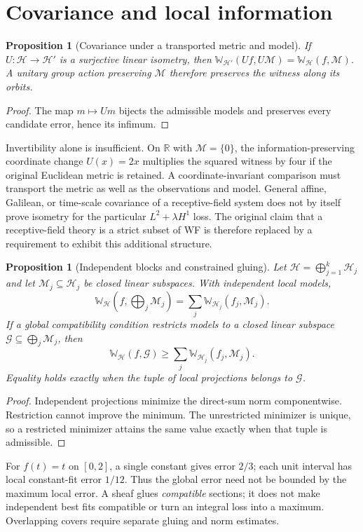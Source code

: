 \documentclass[11pt,letterpaper]{article}
\newtheorem{proposition}[theorem]{Proposition}
\newcommand{\HH}{\mathcal H}
\newcommand{\MM}{\mathcal M}
\newcommand{\WW}{\mathbb W}
\newcommand{\R}{\mathbb R}
\begin{document}
\section{Covariance and local information}
\begin{proposition}[Covariance under a transported metric and model]
If $U:\HH\to\HH'$ is a surjective linear isometry, then
$\WW_{\HH'}(Uf,U\MM)=\WW_\HH(f,\MM)$. A unitary group action preserving
$\MM$ therefore preserves the witness along its orbits.
\end{proposition}
\begin{proof}
The map $m\mapsto Um$ bijects the admissible models and preserves every
candidate error, hence its infimum.
\end{proof}
Invertibility alone is insufficient. On $\R$ with $\MM=\{0\}$, the
information-preserving coordinate change $U(x)=2x$ multiplies the
squared witness by four if the original Euclidean metric is retained.
A coordinate-invariant comparison must transport the metric as well
as the observations and model. General affine, Galilean, or time-scale
covariance of a receptive-field system does not by itself prove
isometry for the particular $L^2+\lambda H^1$ loss. The original claim
that a receptive-field theory is a strict subset of WF is therefore
replaced by a requirement to exhibit this additional structure.

\begin{proposition}[Independent blocks and constrained gluing]\label{prop:glue}
Let $\HH=\bigoplus_{j=1}^k\HH_j$ and let
$\MM_j\subseteq\HH_j$ be closed linear subspaces. With independent local
models,
\[
\WW_{\HH}(f,\bigoplus_j\MM_j)=\sum_j\WW_{\HH_j}(f_j,\MM_j).
\]
If a global compatibility condition restricts models to a closed linear
subspace $\mathcal G\subseteq\bigoplus_j\MM_j$, then
\[
\WW_{\HH}(f,\mathcal G)\ge\sum_j\WW_{\HH_j}(f_j,\MM_j).
\]
Equality holds exactly when the tuple of local projections belongs to
$\mathcal G$.
\end{proposition}
\begin{proof}
Independent projections minimize the direct-sum norm componentwise.
Restriction cannot improve the minimum. The unrestricted minimizer is
unique, so a restricted minimizer attains the same value exactly when
that tuple is admissible.
\end{proof}
For $f(t)=t$ on $[0,2]$, a single constant gives error $2/3$;
each unit interval has local constant-fit error $1/12$.
Thus the global error need not be bounded by the maximum local error.
A sheaf glues \emph{compatible} sections; it does not make independent
best fits compatible or turn an integral loss into a maximum.
Overlapping covers require separate gluing and norm estimates.
\end{document}
